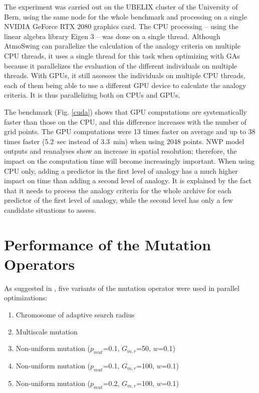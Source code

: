 \documentclass[draft]{agujournal2019}
\begin{document}
The experiment was carried out on the UBELIX cluster of the University of Bern, using the same node for the whole benchmark and processing on a single NVIDIA GeForce RTX 2080 graphics card. The CPU processing -- using the linear algebra library Eigen 3 \cite{Guennebaud2010} -- was done on a single thread. Although AtmoSwing can parallelize the calculation of the analogy criteria on multiple CPU threads, it uses a single thread for this task when optimizing with GAs because it parallelizes the evaluation of the different individuals on multiple threads. With GPUs, it still assesses the individuals on multiple CPU threads, each of them being able to use a different GPU device to calculate the analogy criteria. It is thus parallelizing both on CPUs and GPUs.

The benchmark (Fig. \ref{cuda}) shows that GPU computations are systematically faster than those on the CPU, and this difference increases with the number of grid points. The GPU computations were 13 times faster on average and up to 38 times faster (5.2~sec instead of 3.3~min) when using 2048 points. NWP model outputs and reanalyses show an increase in spatial resolution; therefore, the impact on the computation time will become increasingly important. When using CPU only, adding a predictor in the first level of analogy has a much higher impact on time than adding a second level of analogy. It is explained by the fact that it needs to process the analogy criteria for the whole archive for each predictor of the first level of analogy, while the second level has only a few candidate situations to assess.



\section{Performance of the Mutation Operators}

As suggested in , five variants of the mutation operator were used in parallel optimizations:

\begin{enumerate}
	\item Chromosome of adaptive search radius \cite{Horton2017a}
	\item Multiscale mutation \cite{Horton2017a}
	\item Non-uniform mutation ($p_{mut}$=0.1, $G_{m,r}$=50, $w$=0.1)
	\item Non-uniform mutation ($p_{mut}$=0.1, $G_{m,r}$=100, $w$=0.1)
	\item Non-uniform mutation ($p_{mut}$=0.2, $G_{m,r}$=100, $w$=0.1)
\end{enumerate}
\end{document}
